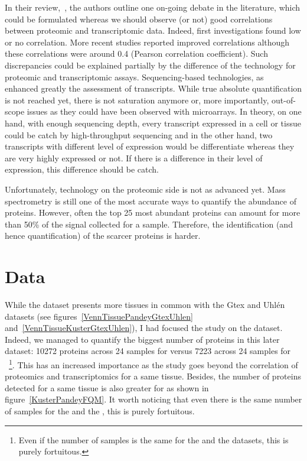In their review,~\cite{Uhlen:2016}, the authors outline one on-going debate
in the literature, which could be formulated whereas we should observe (or not) good
correlations between proteomic and transcriptomic data.
Indeed, first investigations found low or no correlation. More recent
studies reported improved correlations although these correlations were around
0.4 (Pearson correlation coefficient). Such discrepancies could be explained
partially by the difference of the technology for proteomic and transcriptomic
assays. Sequencing-based technologies, as \Rnaseq\, enhanced greatly the assessment
of transcripts. While true absolute quantification is not reached yet, there is
not saturation anymore or, more importantly, out-of-scope issues as they could
have been observed with microarrays. In theory, on one hand, with enough
sequencing depth, every transcript expressed in a cell or tissue could be catch
by high-throughput sequencing and in the other hand, two transcripts with different
level of expression would be differentiate  whereas they are very highly expressed
or not. If there is a difference in their level of expression, this difference
should be catch.

Unfortunately, technology on the proteomic side is not as advanced yet.
Mass spectrometry is still one of the most accurate ways to quantify the abundance
of proteins. However, often the top 25 most abundant proteins can amount for more
than 50\% of the signal collected for a sample. Therefore, the identification (and
hence quantification) of the scarcer proteins is harder.


\section{Data}
\label{sec:IntegrationResults}
While the  dataset presents more tissues in common
with the Gtex and Uhlén datasets (see figures~\ref{VennTissuePandeyGtexUhlen}
and~\ref{VennTissueKusterGtexUhlen}), I had focused the study on
the  dataset. Indeed, we managed to quantify the biggest number
of proteins in this later dataset: 10272 proteins across 24 samples for
 versus 7223 across 24 samples for ~\footnote{Even
if the number of samples is the same for the  and
the  datasets, this is purely fortuitous.}.
This has an increased importance as the study goes beyond the correlation of
proteomics and transcriptomics for a same tissue. Besides, the number of proteins
detected for a same tissue is also greater for  as shown
in figure~\ref{KusterPandeyFQM}.
It worth noticing that even there is the same number of samples for the
 and the , this is purely fortuitous.

